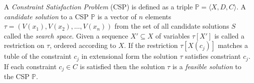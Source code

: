 A \emph{Constraint Satisfaction Problem} (CSP) is defined as a triple $\mathbb{P} = \langle X,D,C \rangle$. A 
\emph{candidate solution} to a CSP $\mathbb{P}$ is a vector of $n$ elements \\
$\tau = (V(x_1), V(x_2), \dots , V(x_n))$ from the set of all candidate solutions $S$ called the \emph{search space}.  
Given a sequence $X' \subseteq X$ of variables $\tau[X']$ is called a restriction on $\tau$, ordered according to 
$X$. If the restriction $\tau[X(c_j)]$ matches a tuble of the constraint $c_j$ in extensional form the solution $\tau$ 
satisfies constriant $c_j$. If each constraint $c_j \in C$ is satisfied then the solution $\tau$ is a \emph{feasible 
solution} to the CSP $\mathbb{P}$. \\


